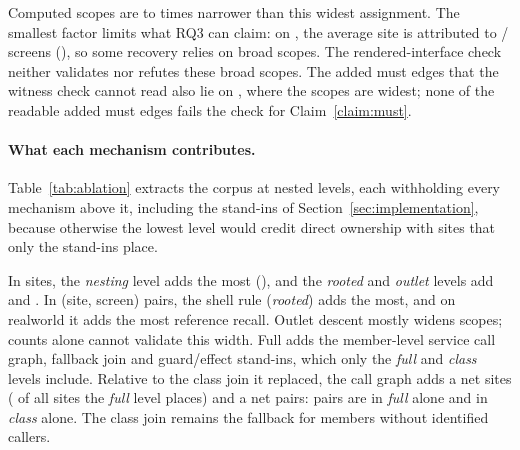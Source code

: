 Computed scopes are \BaselineFactorMin{} to \BaselineFactorMax{} times narrower than this widest assignment.
The smallest factor limits what RQ3 can claim: on \BaselineBluntest{}, the average site is attributed to
\BaselineBluntestScope{}/\BaselineBluntestScreens{} screens (\BaselineBluntestShare{}), so some
recovery relies on broad scopes. The rendered-interface check neither validates nor refutes these broad scopes. The added must edges
that the witness check cannot read also lie on \BaselineBluntest{}, where the scopes are widest; none
of the readable added must edges fails the check for Claim~\ref{claim:must}.

\paragraph{What each mechanism contributes.}
\label{sec:res-ablation}

Table~\ref{tab:ablation} extracts the corpus at \AblationLevels{}
nested levels, each withholding every mechanism above it, including the stand-ins of
Section~\ref{sec:implementation}, because otherwise the lowest
level would credit direct ownership with sites that only the stand-ins place.

\begin{table}[t]\footnotesize
\caption{The corpus extracted at each attribution level.}
\label{tab:ablation}
\setlength{\tabcolsep}{5pt}
\TabAblation
\par{}
\end{table}

In sites, the \emph{nesting} level adds the most (\AblationNestingAddedSites{}), and the \emph{rooted} and \emph{outlet} levels
add \AblationRootedAddedSites{} and \AblationOutletAddedSites{}. In (site, screen) pairs, the shell rule (\emph{rooted}) adds the most, and on realworld it adds the most reference recall.
Outlet descent mostly widens scopes; counts alone cannot validate this width. Full adds the member-level service call graph, fallback join
and guard/effect stand-ins, which only the \emph{full} and \emph{class} levels include. Relative to the class
join it replaced, the call graph adds a net \AblationCallGraphNetSites{} sites
(\AblationCallGraphNetShare{} of all sites the \emph{full} level places) and a net \AblationCallGraphNetPairs{} pairs:
\AblationFullOnlyPairs{} pairs are in \emph{full} alone and \AblationClassOnlyPairs{} in \emph{class} alone.
The class join remains the fallback for members without identified callers.

